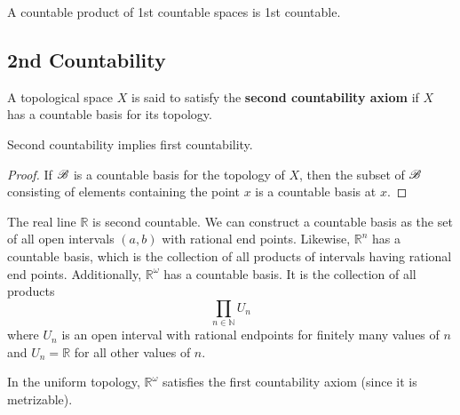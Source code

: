   \begin{theorem}
    \label{thm:countable-products}
    A countable product of 1st countable spaces is 1st countable. 
  \end{theorem}

\subsection{2nd Countability}

  \begin{definition}[2nd-Countability]
    \label{def:2nd-countability}
    A topological space $X$ is said to satisfy the \textbf{second countability axiom} if $X$ has a countable basis for its topology.
  \end{definition}

  \begin{theorem}
    \label{thm:second-countability-implies-first-countability}
    Second countability implies first countability. 
  \end{theorem}
  \begin{proof}
    If $\operatorname{\mathscr{B}}$ is a countable basis for the topology of $X$, then the subset of $\operatorname{\mathscr{B}}$ consisting of elements containing the point $x$ is a countable basis at $x$. 
  \end{proof}

  \begin{example}
    \label{ex:r-is-second-countable}
    The real line $\mathbb{R}$ is second countable. We can construct a countable basis as the set of all open intervals $(a, b)$ with rational end points. Likewise, $\mathbb{R}^n$ has a countable basis, which is the collection of all products of intervals having rational end points. Additionally, $\mathbb{R}^\omega$ has a countable basis. It is the collection of all products
    \begin{equation}
      \prod_{n \in \mathbb{N}} U_n
    \end{equation}
    where $U_n$ is an open interval with rational endpoints for finitely many values of $n$ and $U_n = \mathbb{R}$ for all other values of $n$. 
  \end{example}

  \begin{example}
    \label{ex:first-countability-of-the-uniform-topology}
    In the uniform topology, $\mathbb{R}^\omega$ satisfies the first countability axiom (since it is metrizable). 
  \end{example}


